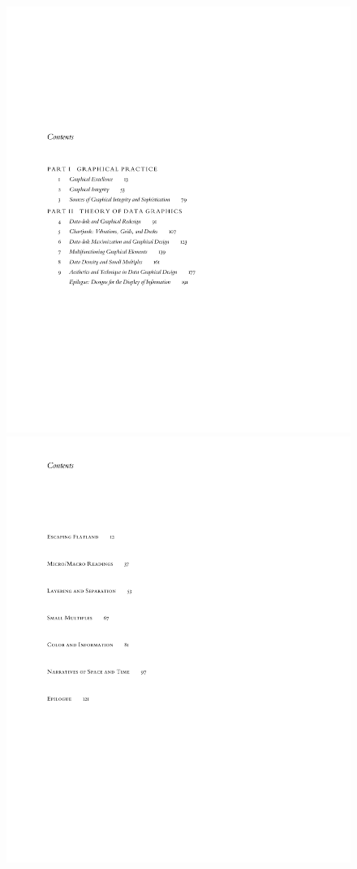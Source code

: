 \documentclass[
  twoside,
  symmetric]{tufte-book}
\begin{document}
\begin{figure}

\includegraphics[width=0.45\linewidth,height=\textheight,keepaspectratio]{style-guide/graphics/vdqi-contents.pdf}
\includegraphics[width=0.45\linewidth,height=\textheight,keepaspectratio]{style-guide/graphics/ei-contents.pdf}


\end{figure}
\end{document}
